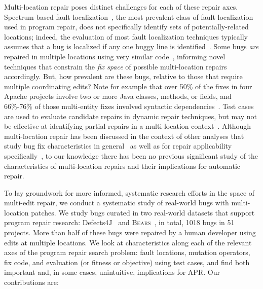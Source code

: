 \documentclass[10pt, conference]{IEEEtran}
\newcommand\bears{\textsc{Bears}\xspace}
\begin{document}
Multi-location repair poses distinct challenges for each of these repair axes.
Spectrum-based fault localization~\cite{ochiai}, the most prevalent class of
fault localization used in program repair, does not specifically
identify sets of potentially-related locations; indeed,
the evaluation of most fault localization techniques typically assumes that a bug
is localized if any one buggy line is identified~\cite{fl-survey-wong}.
Some bugs \emph{are}
repaired in multiple locations using very similar
code~\cite{saha2019harnessing,jiang2019cmsuggester}, informing novel techniques
that constrain the \emph{fix space} of possible multi-location repairs accordingly.
But, how prevalent are these bugs, 
relative to those that require multiple
coordinating edits?
Note for example that over 50\% of the fixes in four 
Apache projects involve two or more  Java classes, methods, or fields, and  66\%-76\% of 
those multi-entity fixes involved syntactic dependencies~\cite{wang2018}. 
Test cases are used to evaluate candidate repairs in dynamic
repair techniques, but may not be effective
at identifying partial repairs in a multi-location
context~\cite{better-fitness}.  
Although multi-location repair has been discussed in the context of other analyses
that study bug fix characteristics in general~\cite{d4j-dissection} as well as for
repair applicability specifically~\cite{zhong2015, wang2018}, 
to our
knowledge there has been no previous significant study of the characteristics of
multi-location repairs and their implications for automatic
repair.

To lay groundwork for more informed, systematic research
efforts in the space of multi-edit repair, we conduct a systematic study of real-world bugs with
multi-location patches.  We study bugs curated in two
real-world datasets that support program repair research: Defects4J~\cite{defects4j}
and \bears~\cite{bears}, in total, 1018 bugs in 51 projects.
More than half of these bugs were repaired by a
human developer using edits at multiple locations.  We look at characteristics along each of the
relevant axes of the program repair search problem: fault locations, mutation
operators, fix code, and evaluation (or fitness or objective) using test cases,
and find both important and, in some cases, unintuitive, implications for
APR.  Our contributions are:
\end{document}
